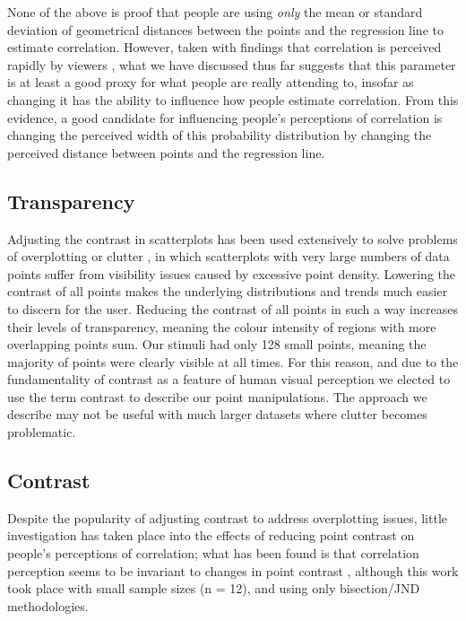 \documentclass[preprint, 3p,
authoryear]{elsarticle} %
\begin{document}
None of the above is proof that people are using \emph{only} the mean or
standard deviation of geometrical distances between the points and the
regression line to estimate correlation. However, taken with findings
that correlation is perceived rapidly by viewers \citep{rensink_2014},
what we have discussed thus far suggests that this parameter is at least
a good proxy for what people are really attending to, insofar as
changing it has the ability to influence how people estimate
correlation. From this evidence, a good candidate for influencing
people's perceptions of correlation is changing the perceived width of
this probability distribution by changing the perceived distance between
points and the regression line.

\hypertarget{transparency}{%
\subsection{Transparency}\label{transparency}}

Adjusting the contrast in scatterplots has been used extensively to
solve problems of overplotting or clutter
\citep{matejka_2015, bertini_2004}, in which scatterplots with very
large numbers of data points suffer from visibility issues caused by
excessive point density. Lowering the contrast of all points makes the
underlying distributions and trends much easier to discern for the user.
Reducing the contrast of all points in such a way increases their levels
of transparency, meaning the colour intensity of regions with more
overlapping points sum. Our stimuli had only 128 small points, meaning
the majority of points were clearly visible at all times. For this
reason, and due to the fundamentality of contrast as a feature of human
visual perception \citep{ginsburg_2003} we elected to use the term
contrast to describe our point manipulations. The approach we describe
may not be useful with much larger datasets where clutter becomes
problematic.

\hypertarget{contrast}{%
\subsection{Contrast}\label{contrast}}

Despite the popularity of adjusting contrast to address overplotting
issues, little investigation has taken place into the effects of
reducing point contrast on people's perceptions of correlation; what has
been found is that correlation perception seems to be invariant to
changes in point contrast \citep{rensink_2012}, although this work took
place with small sample sizes (n = 12), and using only bisection/JND
methodologies.
\end{document}
